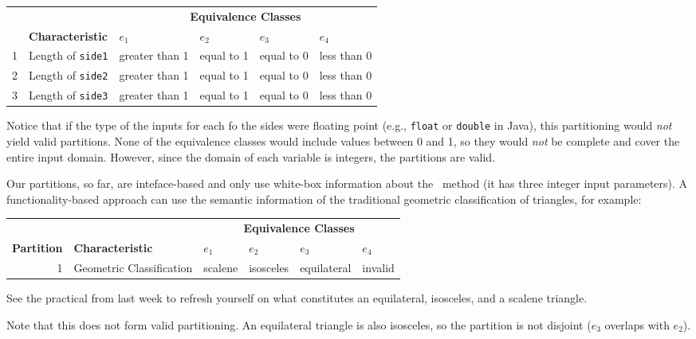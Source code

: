 \begin{center}
\begin{tabular}{rlllll}
    \toprule
    & & \multicolumn{4}{c}{\bf Equivalence Classes} \\
    \cline{3-6}
    & {\bf Characteristic} & $e_1$ & $e_2$ & $e_3$ & $e_4$ \\
    \midrule
    1 & Length of {\tt side1} & greater than 1 & equal to 1 & equal to 0 & less than 0 \\
    2 & Length of {\tt side2} & greater than 1 & equal to 1 & equal to 0 & less than 0 \\
    3 & Length of {\tt side3} & greater than 1 & equal to 1 & equal to 0 & less than 0 \\
    \bottomrule    
\end{tabular}
\end{center}

Notice that if the type of the inputs for each fo the sides were floating point
(e.g., {\tt float} or {\tt double} in Java), this partitioning would {\it not}
yield valid partitions. None of the equivalence classes would include values
between 0 and 1, so they would {\it not} be complete and cover the entire input
domain. However, since the domain of each variable is integers, the partitions
are valid.

Our partitions, so far, are inteface-based and only use white-box information
about the \classifymethod~method (it has three integer input parameters). A
functionality-based approach can use the semantic information of the traditional
geometric classification of triangles, for example:

\begin{center}
\begin{tabular}{rlllll}
    \toprule
    & & \multicolumn{4}{c}{\bf Equivalence Classes} \\
    \cline{3-6}
    {\bf Partition} & {\bf Characteristic} & $e_1$ & $e_2$ & $e_3$ & $e_4$ \\
    \midrule
    1 & Geometric Classification & scalene & isosceles & equilateral & invalid \\
    \bottomrule    
\end{tabular}
\end{center}

See the practical from last week to refresh yourself on what constitutes an
equilateral, isosceles, and a scalene triangle.

Note that this does not form valid partitioning. An equilateral triangle is also
isosceles, so the partition is not disjoint ($e_3$ overlaps with $e_2$). 


